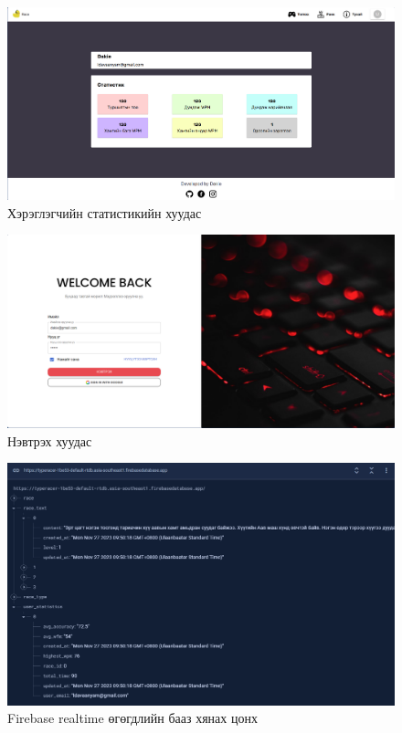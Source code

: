 \begin{figure}[h]
	\centering
	\includegraphics[width=13cm]{images/result/statisticspage.png}
	\caption{Хэрэглэгчийн статистикийн хуудас}
	\label{fig:results}
\end{figure}

\begin{figure}[h]
	\centering
	\includegraphics[width=13cm]{images/result/loginpage.png}
	\caption{Нэвтрэх хуудас}
	\label{fig:results}
\end{figure}

\begin{figure}[h]
	\centering
	\includegraphics[width=13cm]{images/result/firebase.png}
	\caption{ Firebase realtime өгөгдлийн бааз хянах цонх}
	\label{fig:results}
\end{figure}